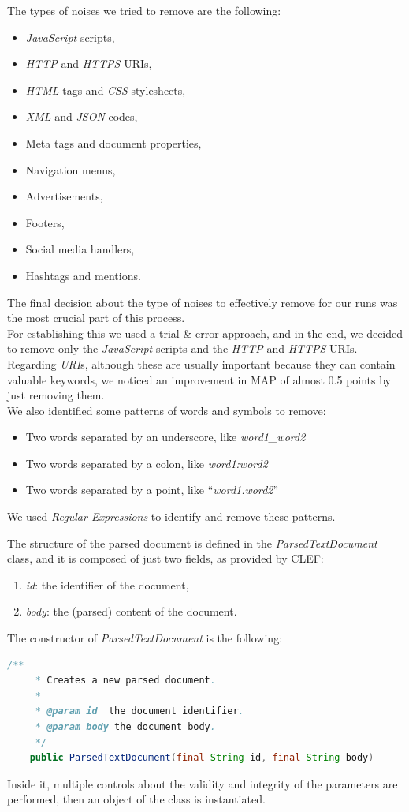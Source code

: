 \newpage
The types of noises we tried to remove are the following:
\begin{itemize}
\item \textit{JavaScript} scripts,
\item \textit{HTTP} and \textit{HTTPS} URIs,
\item \textit{HTML} tags and \textit{CSS} stylesheets,
\item \textit{XML} and \textit{JSON} codes,
\item Meta tags and document properties,
\item Navigation menus,
\item Advertisements,
\item Footers,
\item Social media handlers,
\item Hashtags and mentions.
\end{itemize}
The final decision about the type of noises to effectively remove for our runs was the most crucial part of this process. \\
For establishing this we used a trial \& error approach, and in the end, we decided to remove only the \textit{JavaScript} scripts and the \textit{HTTP} and \textit{HTTPS} URIs. Regarding \textit{URI}s, although these are usually important because they can contain valuable keywords, we noticed an improvement in \ac{MAP} of almost 0.5 points by just removing them. \\
We also identified some patterns of words and symbols to remove:
\begin{itemize}
\item Two words separated by an underscore, like \textit{word1\_word2}
\item Two words separated by a colon, like \textit{word1:word2}
\item Two words separated by a point, like ``\textit{word1.word2}''
\end{itemize}
We used \textit{Regular Expressions} \cite{regexdefinition} to identify and remove these patterns.  

The structure of the parsed document is defined in the \textit{ParsedTextDocument} class, and it is composed of just two fields, as provided by \ac{CLEF}:
\begin{enumerate}
\item \textit{id}: the identifier of the document,
\item \textit{body}: the (parsed) content of the document.
\end{enumerate}
The constructor of \textit{ParsedTextDocument} is the following:
\begin{lstlisting}[language=Java]
    /**
     * Creates a new parsed document.
     *
     * @param id  the document identifier.
     * @param body the document body.
     */
    public ParsedTextDocument(final String id, final String body) 
\end{lstlisting}
Inside it, multiple controls about the validity and integrity of the parameters are performed, then an object of the class is instantiated. 


